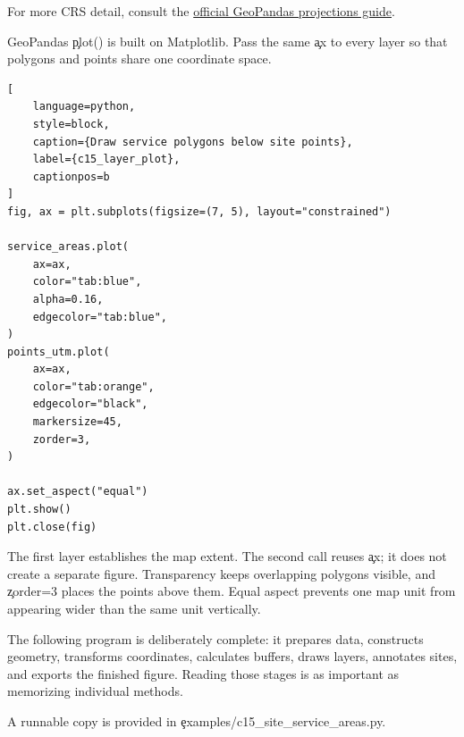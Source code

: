 For more CRS detail, consult the
\href{https://docs.geopandas.org/en/stable/docs/user_guide/projections.html}{official GeoPandas projections guide}.


GeoPandas \c{plot()} is built on Matplotlib. Pass the same \c{ax} to every layer
so that polygons and points share one coordinate space.

\begin{lstlisting}[
    language=python,
    style=block,
    caption={Draw service polygons below site points},
    label={c15_layer_plot},
    captionpos=b
]
fig, ax = plt.subplots(figsize=(7, 5), layout="constrained")

service_areas.plot(
    ax=ax,
    color="tab:blue",
    alpha=0.16,
    edgecolor="tab:blue",
)
points_utm.plot(
    ax=ax,
    color="tab:orange",
    edgecolor="black",
    markersize=45,
    zorder=3,
)

ax.set_aspect("equal")
plt.show()
plt.close(fig)
\end{lstlisting}

The first layer establishes the map extent. The second call reuses \c{ax}; it
does not create a separate figure. Transparency keeps overlapping polygons
visible, and \c{zorder=3} places the points above them. Equal aspect prevents
one map unit from appearing wider than the same unit vertically.

\label{sec:c15-application}

The following program is deliberately complete: it prepares data, constructs
geometry, transforms coordinates, calculates buffers, draws layers, annotates
sites, and exports the finished figure. Reading those stages is as important
as memorizing individual methods.

A runnable copy is provided in \c{examples/c15_site_service_areas.py}.

